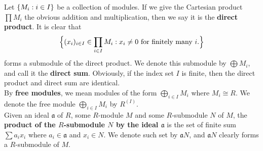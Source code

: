 \documentclass{report}
\begin{document}
Let $\{ M_i:i \in I \}$ be a collection of modules. If we give the Cartesian product $\prod M_i$ the obvious addition and multiplication, then we say it is the \textbf{direct product}. It is clear that 
\begin{align*}
\Big\{ (x_i)_{i \in I} \in \prod_{i \in I}M_i:x_i \neq 0\text{ for finitely many }i. \Big\}
\end{align*}
forms a submodule of the direct product. We denote this submodule by $\bigoplus M_i$, and call it the  \textbf{direct sum}.  Obviously, if the index set $I$ is finite, then the direct product and direct sum are identical.  \\

By \textbf{free modules}, we mean modules of the form $\bigoplus_{i \in I}M_i$ where $M_i \cong R$. We denote the free module $\bigoplus_{i \in I}M_i$ by $R^{(I)}$. \\




Given an ideal $\mathfrak{a}$ of $R$, some  $R$-module $M$ and some  $R$-submodule  $N$ of  $M$, the \textbf{product of the $R$-submodule $N$  by the ideal $\mathfrak{a}$}  is the set of finite sum $\sum a_i x_i$ where $a_i \in \mathfrak{a}$ and $x_i \in N$. We denote such set by  $\mathfrak{a}N$, and $\mathfrak{a}N$ clearly forms a $R$-submodule of $M$. \\
\end{document}
